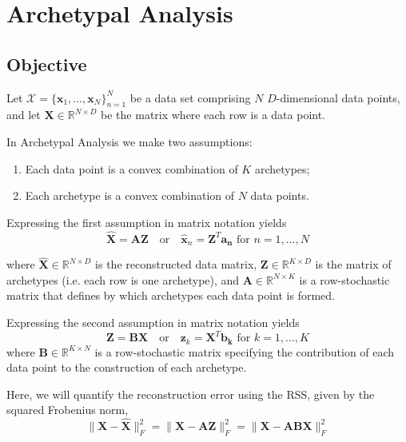 \documentclass{article}
\begin{document}
\clearpage

\section{Archetypal Analysis}

\subsection{Objective}

Let $\mathcal{X}=\{\mathbf{x}_1, \ldots, \mathbf{x}_N\}_{n=1}^N$ be a data set comprising $N$ $D$-dimensional data points, and let $\mathbf{X} \in \mathbb{R}^{N \times D}$ be the matrix where each row is a data point.

In Archetypal Analysis we make two assumptions:

\begin{enumerate}
    \item Each data point is a convex combination of $K$ archetypes;
    \item Each archetype is a convex combination of $N$ data points.
\end{enumerate}

Expressing the first assumption in matrix notation yields
\begin{equation}
\label{eq:first-assumption}
\hat{\mathbf{X}} = \mathbf{A} \mathbf{Z} \quad \text{or} \quad \hat{\mathbf{x}}_n = \mathbf{Z}^T \mathbf{a_n} \text{ for } n = 1, ..., N
\end{equation}

where $\hat{\mathbf{X}} \in \mathbb{R}^{N \times D}$ is the reconstructed data matrix, $\mathbf{Z} \in \mathbb{R}^{K \times D}$ is the matrix of archetypes (i.e. each row is one archetype), and $\mathbf{A} \in \mathbb{R}^{N \times K}$ is a row-stochastic matrix that defines by which archetypes each data point is formed.

Expressing the second assumption in matrix notation yields\begin{equation}
\label{eq:second-assumption}
\mathbf{Z} = \mathbf{B} \mathbf{X} \quad \text{or} \quad \mathbf{z}_k = \mathbf{X}^T \mathbf{b_k} \text{ for } k = 1, ..., K
\end{equation}
where $\mathbf{B} \in \mathbb{R}^{K \times N}$ is a row-stochastic matrix specifying the contribution of each data point to the construction of each archetype.

Here, we will quantify the reconstruction error  using the RSS, given by the squared Frobenius norm,
\begin{equation}
\label{eq:rss}
\| \mathbf{X} - \hat{\mathbf{X}} \|_F^2 = \| \mathbf{X} - \mathbf{A} \mathbf{Z} \|_F^2 =  \| \mathbf{X} -  \mathbf{A} \mathbf{B} \mathbf{X} \|_F^2
\end{equation}
\end{document}
